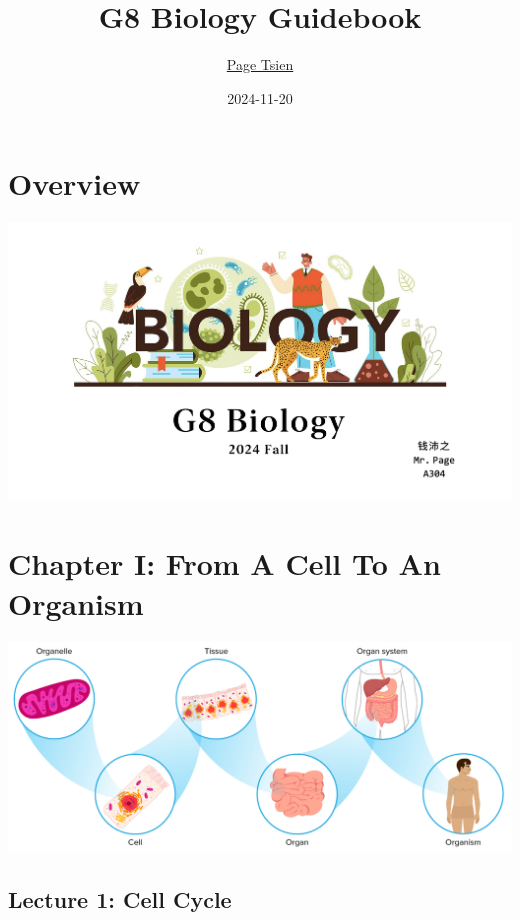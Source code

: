 \documentclass[
]{book}
\title{G8 Biology Guidebook}
\author{\href{https://pagius5.github.io/}{Page Tsien}}
\date{2024-11-20}
\begin{document}
\maketitle

{
\setcounter{tocdepth}{1}
\tableofcontents
}
\hypertarget{overview}{%
\chapter{Overview}\label{overview}}

\includegraphics{./img/g8-bio.png}

\hypertarget{chapter-i-from-a-cell-to-an-organism}{%
\chapter{Chapter I: From A Cell To An Organism}\label{chapter-i-from-a-cell-to-an-organism}}

\includegraphics{./img/ch1.png}

\hypertarget{lecture-1-cell-cycle}{%
\section{Lecture 1: Cell Cycle}\label{lecture-1-cell-cycle}}
\end{document}

